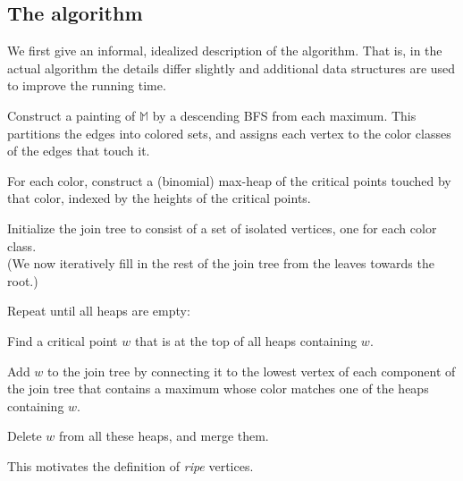 \documentclass[11pt]{article}
\theoremstyle{definition}
\newcommand{\MM}{\mathbb{M}}
\begin{document}
\subsection{The algorithm} \label{sec:algo}

We first give an informal, idealized description of the algorithm. 
That is, in the actual algorithm the details differ slightly
and additional data structures are used to improve the running time.

\medskip

\begin{compactenum}
    \item Construct a painting of $\MM$ by a descending BFS from each maximum. 
    This partitions the edges into colored sets, 
    and assigns each vertex to the color classes of the edges that touch it.
    \item For each color, construct a (binomial) max-heap of the critical points touched by that color, 
          indexed by the heights of the critical points.
    \item Initialize the join tree to consist of a set of isolated vertices, one for each color class.\\
          (We now iteratively fill in the rest of the join tree from the leaves towards the root.)
    \item Repeat until all heaps are empty:
    \begin{compactenum}
        \item Find a critical point $w$ that is at the top of all heaps containing $w$.
        \item Add $w$ to the join tree by connecting it to the lowest vertex 
              of each component of the join tree that contains a maximum whose color matches one of the heaps containing $w$.
        \item Delete $w$ from all these heaps, and merge them.
    \end{compactenum}
\end{compactenum}

\medskip

\noindent
This motivates the definition of \emph{ripe} vertices.
\end{document}

